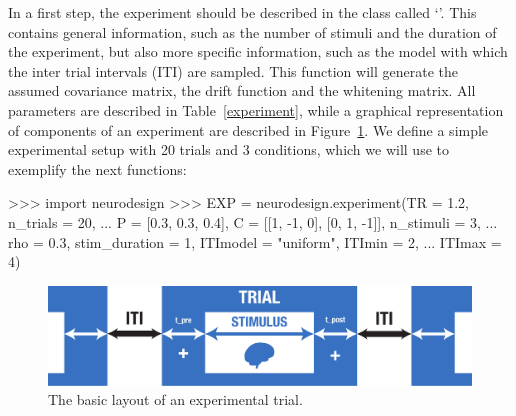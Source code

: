 \documentclass[article]{jss}
\begin{document}
In a first step, the experiment should be described in the class
called `'.  This contains general information, such
as the number of stimuli and the duration of the experiment, but also
more specific information, such as the model with which the inter
trial intervals (ITI) are sampled.  This function will generate the
assumed covariance matrix, the drift function and the whitening
matrix.  All parameters are described in Table~\ref{experiment}, while
a graphical representation of components of an experiment are
described in Figure~\ref{fig3}.  We define a simple experimental setup
with 20 trials and 3 conditions, which we will use to exemplify the
next functions:
\begin{CodeChunk}
\begin{CodeInput}
>>> import neurodesign
>>> EXP = neurodesign.experiment(TR = 1.2, n_trials = 20, 
...   P = [0.3, 0.3, 0.4], C = [[1, -1, 0], [0, 1, -1]], n_stimuli = 3,  
...   rho = 0.3, stim_duration = 1, ITImodel = "uniform", ITImin = 2, 
...   ITImax = 4)
\end{CodeInput}
\end{CodeChunk}
\begin{figure}[t!]
\centering
\includegraphics[scale=0.35]{experiment_structure.pdf}
\caption{The basic layout of an experimental trial. \label{fig3}}
\end{figure}
%
\end{document}
